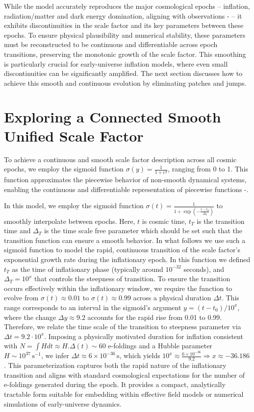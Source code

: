 \documentclass[12pt]{article}  %
\begin{document}
 
While the model accurately reproduces the major cosmological epochs – inflation, radiation/matter and dark energy domination, aligning with observations \cite{31}-\cite{36} – it exhibits discontinuities in the scale factor and its key parameters between these epochs. To ensure physical plausibility and numerical stability, these parameters must be reconstructed to be continuous and differentiable across epoch transitions, preserving the monotonic growth of the scale factor. This smoothing is particularly crucial for early-universe inflation models, where even small discontinuities can be significantly amplified. The next section discusses how to achieve this smooth and continuous evolution by eliminating patches and jumps.


\section{Exploring a Connected Smooth Unified Scale Factor}

To achieve a continuous and smooth scale factor description across all cosmic epochs, we employ the sigmoid function $\sigma(y) = \frac{1}{1 + e^{y}}$, ranging from 0 to 1. This function approximates the piecewise behavior of non-smooth dynamical systems, enabling the continuous and differentiable representation of piecewise functions \cite{28}-\cite{30}. 

In this model, we employ the sigmoid function $\sigma(t) = \frac{1}{1 + \exp\left(-\frac{t - t_{T}}{\Delta_{T}}\right)}$ to smoothly interpolate between epochs. Here, $t$ is cosmic time, \(t_T\) is the transition time and \(\Delta_T\) is the time scale free parameter which should be set such that the transition function can ensure a smooth behavior. 
In what follows we use such a sigmoid function to model the rapid, continuous transition of the scale factor's exponential growth rate during the inflationary epoch. In this function we defined $t_T$ as the time of inflationary phase (typically around $10^{-32}$ seconds), and $\Delta_T = 10^x$ that controls the steepness of transition. To ensure the transition occurs effectively within the inflationary window, we require the function to evolve from $\sigma(t) \approx 0.01$ to $\sigma(t) \approx 0.99$ across a physical duration $\Delta t$. This range corresponds to an interval in the sigmoid’s argument $y = (t - t_0)/10^x$, where the change $\Delta y \approx 9.2$ accounts for the rapid rise from 0.01 to 0.99. Therefore, we relate the time scale of the transition to steepness parameter via $\Delta t = 9.2 \cdot 10^x$.
Imposing a physically motivated duration for inflation consistent with $N=\int{H dt}\approx H.\Delta (t) \sim 60$ e-foldings and a Hubble parameter $H \sim 10^{37} \, \text{s}^{-1}$, we infer $\Delta t \approx 6 \times 10^{-36} \, \text{s}$, which yields $10^x \approx \frac{6 \times 10^{-36}}{9.2} \Rightarrow x \approx -36.186$. This parameterization captures both the rapid nature of the inflationary transition and aligns with standard cosmological expectations for the number of e-foldings generated during the epoch. It provides a compact, analytically tractable form suitable for embedding within effective field models or numerical simulations of early-universe dynamics. 
\end{document}
